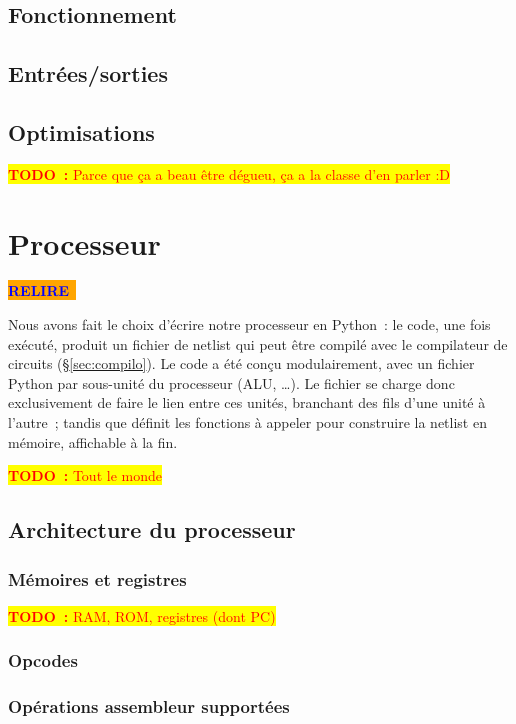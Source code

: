 \documentclass[11pt,a4paper]{article}
\newcommand{\htodo}[1]{\begin{huge}\colorbox{yellow}{\textcolor{red}{\textbf{TODO~:} #1}}\end{huge}}
\newcommand{\todo}[1]{\colorbox{yellow}{\textcolor{red}{\textbf{TODO~:} #1}}}
\newcommand{\relire}{\colorbox{orange}{\textcolor{blue}{\textbf{RELIRE}~}}}
\begin{document}
\subsection{Fonctionnement}

\subsection{Entrées/sorties} \label{ssec:compilo_io}

\subsection{Optimisations}
\todo{Parce que ça a beau être dégueu, ça a la classe d'en parler :D}

\section{Processeur} \label{sec:proc}

\relire

Nous avons fait le choix d'écrire notre processeur en Python~: le code, une fois exécuté, produit un fichier de netlist qui peut être compilé avec le compilateur de circuits (§\ref{sec:compilo}). Le code a été conçu modulairement, avec un fichier Python par sous-unité du processeur (ALU, \ldots). Le fichier  se charge donc exclusivement de faire le lien entre ces unités, \og branchant \fg{} des fils d'une unité à l'autre~; tandis que  définit les fonctions à appeler pour construire la netlist en mémoire, affichable à la fin.

\htodo{Tout le monde}

\subsection{Architecture du processeur}

\subsubsection{Mémoires et registres} \label{sssec:memory}
\todo{RAM, ROM, registres (dont PC)}
\subsubsection{Opcodes} \label{sssec:opcodes}
\subsubsection{Opérations assembleur supportées}
\end{document}
